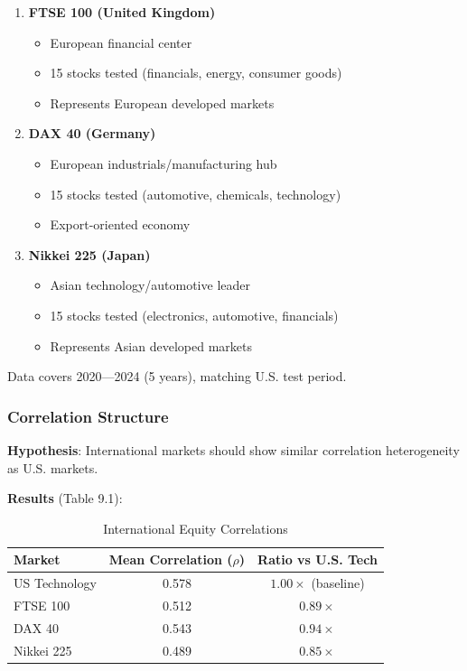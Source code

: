 \begin{enumerate}
\item \textbf{FTSE 100 (United Kingdom)}
   \begin{itemize}
   \item European financial center
   \item 15 stocks tested (financials, energy, consumer goods)
   \item Represents European developed markets
   \end{itemize}

\item \textbf{DAX 40 (Germany)}
   \begin{itemize}
   \item European industrials/manufacturing hub
   \item 15 stocks tested (automotive, chemicals, technology)
   \item Export-oriented economy
   \end{itemize}

\item \textbf{Nikkei 225 (Japan)}
   \begin{itemize}
   \item Asian technology/automotive leader
   \item 15 stocks tested (electronics, automotive, financials)
   \item Represents Asian developed markets
   \end{itemize}
\end{enumerate}

Data covers 2020---2024 (5 years), matching U.S. test period.

\subsubsection{Correlation Structure}

\textbf{Hypothesis}: International markets should show similar correlation heterogeneity as U.S. markets.

\textbf{Results} (Table 9.1):

\begin{table}[H]
\centering
\caption{International Equity Correlations}
\label{tab:intl-correlations}
\begin{tabular}{@{}lcc@{}}
\toprule
\textbf{Market} & \textbf{Mean Correlation ($\rho$)} & \textbf{Ratio vs U.S. Tech} \\
\midrule
US Technology & 0.578 & $1.00\times$ (baseline) \\
FTSE 100 & 0.512 & $0.89\times$ \\
DAX 40 & 0.543 & $0.94\times$ \\
Nikkei 225 & 0.489 & $0.85\times$ \\
\bottomrule
\end{tabular}
\end{table}

